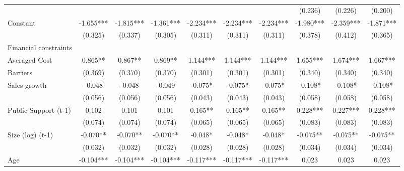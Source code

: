 \begin{table}[htbp]
\begin{tabular}{l*{9}{c}}
                    &               &               &               &               &               &               &     (0.236)   &     (0.226)   &     (0.200)   \\
Constant            &      -1.655***&      -1.815***&      -1.361***&      -2.234***&      -2.234***&      -2.234***&      -1.980***&      -2.359***&      -1.871***\\
                    &     (0.325)   &     (0.337)   &     (0.305)   &     (0.311)   &     (0.311)   &     (0.311)   &     (0.378)   &     (0.412)   &     (0.365)   \\
\hline
Financial constraints&               &               &               &               &               &               &               &               &               \\
Averaged Cost       &       0.865** &       0.867** &       0.869** &       1.144***&       1.144***&       1.144***&       1.655***&       1.674***&       1.667***\\
Barriers            &     (0.369)   &     (0.370)   &     (0.370)   &     (0.301)   &     (0.301)   &     (0.301)   &     (0.340)   &     (0.340)   &     (0.340)   \\
Sales growth        &      -0.048   &      -0.048   &      -0.049   &      -0.075*  &      -0.075*  &      -0.075*  &      -0.108*  &      -0.108*  &      -0.108*  \\
                    &     (0.056)   &     (0.056)   &     (0.056)   &     (0.043)   &     (0.043)   &     (0.043)   &     (0.058)   &     (0.058)   &     (0.058)   \\
Public Support (t-1)&       0.102   &       0.101   &       0.101   &       0.165** &       0.165** &       0.165** &       0.228***&       0.227***&       0.228***\\
                    &     (0.074)   &     (0.074)   &     (0.074)   &     (0.065)   &     (0.065)   &     (0.065)   &     (0.083)   &     (0.083)   &     (0.083)   \\
Size (log) (t-1)    &      -0.070** &      -0.070** &      -0.070** &      -0.048*  &      -0.048*  &      -0.048*  &      -0.075** &      -0.075** &      -0.075** \\
                    &     (0.032)   &     (0.032)   &     (0.032)   &     (0.028)   &     (0.028)   &     (0.028)   &     (0.034)   &     (0.034)   &     (0.034)   \\
Age                 &      -0.104***&      -0.104***&      -0.104***&      -0.117***&      -0.117***&      -0.117***&       0.023   &       0.023   &       0.023   \\

\end{tabular}
\end{table}
